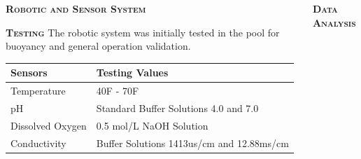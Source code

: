 \documentclass[final,t]{beamer}
\begin{document}
\begin{frame}{}
\begin{columns}
\begin{column}{.34\linewidth}
\begin{alertblock}{\textsc{\textbf{Robotic and Sensor System}}}
  				\end{alertblock}
  				
                \begin{block}{\textsc{\textbf{Testing}}}
                    \vspace*{2mm}
                    	The robotic system was initially tested in the pool for buoyancy and general operation validation.
                    	\vspace{-0.5in}
                    	\begin{center}
                    	\begin{tabular}{l|l}
                    	\textbf{Sensors} & \textbf{Testing Values} \\
                    	\hline 
                    	Temperature & 40F - 70F \\
                    	pH & Standard Buffer Solutions 4.0 and 7.0 \\
                    	Dissolved Oxygen & 0.5 mol/L NaOH Solution \\
                    	Conductivity &  Buffer Solutions 1413us/cm and 12.88ms/cm 
                    	\end{tabular}
                    	\end{center}

                \end{block}

            \end{column}
            \begin{column}{.33\linewidth}

                \begin{block}{\textsc{\textbf{Data Analysis}}}
                    \vspace*{-15mm}


\end{block}
\end{column}
\end{columns}
\end{frame}
\end{document}
